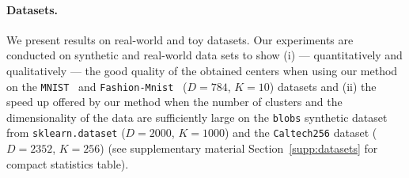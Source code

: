 \paragraph{Datasets.}
We present results on real-world and toy datasets.
Our experiments are conducted on synthetic and real-world data sets to show (i) --- quantitatively and qualitatively --- the good quality of the obtained centers when using our method on the \texttt{MNIST}~\cite{lecun-mnisthandwrittendigit-2010} and \texttt{Fashion-Mnist}~\cite{Pedregosa2011Scikit} %
($D=784$, $K=10$) datasets and (ii) the speed up offered by our method \qkmeans when the number of clusters and the dimensionality of the data are sufficiently large on the \texttt{blobs} synthetic dataset from \texttt{sklearn.dataset}  ($D=2000$, $K=1000$) and the \texttt{Caltech256} \cite{caltech} dataset ($D=2352$, $K=256$) (see supplementary material Section~\ref{supp:datasets} for compact statistics table).


